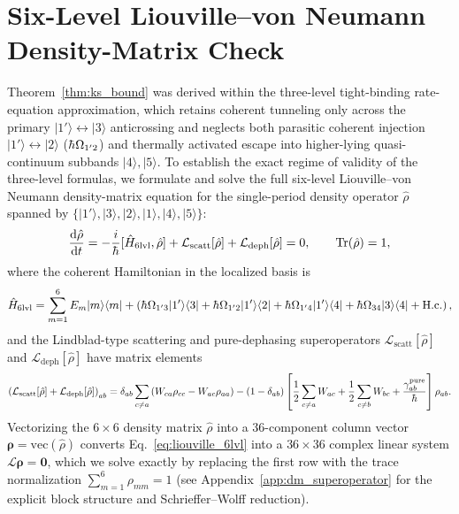 \documentclass[11pt,letterpaper]{article}
\renewcommand{\hbar}{\mathchar'26\mkern-9mu h}
\begin{document}
\section{Six-Level Liouville--von Neumann Density-Matrix Check}
\label{sec:dm_check}

Theorem~\ref{thm:ks_bound} was derived within the three-level tight-binding rate-equation approximation, which retains coherent tunneling only across the primary $|1'\rangle \leftrightarrow |3\rangle$ anticrossing and neglects both parasitic coherent injection $|1'\rangle \leftrightarrow |2\rangle$ ($\hbar\Omega_{1'2}$) and thermally activated escape into higher-lying quasi-continuum subbands $|4\rangle, |5\rangle$. To establish the exact regime of validity of the three-level formulas, we formulate and solve the full six-level Liouville--von Neumann density-matrix equation for the single-period density operator $\hat{\rho}$ spanned by $\{|1'\rangle, |3\rangle, |2\rangle, |1\rangle, |4\rangle, |5\rangle\}$:
\begin{equation}
\frac{\mathrm{d}\hat{\rho}}{\mathrm{d}t} = -\frac{i}{\hbar}[\hat{H}_{\mathrm{6lvl}}, \hat{\rho}] + \mathcal{L}_{\mathrm{scatt}}[\hat{\rho}] + \mathcal{L}_{\mathrm{deph}}[\hat{\rho}] = 0, \qquad \mathrm{Tr}(\hat{\rho}) = 1,
\label{eq:liouville_6lvl}
\end{equation}
where the coherent Hamiltonian in the localized basis is
\begin{equation}
\hat{H}_{\mathrm{6lvl}} = \sum_{m=1}^{6} E_m |m\rangle\langle m| + \left( \hbar\Omega_{1'3}|1'\rangle\langle 3| + \hbar\Omega_{1'2}|1'\rangle\langle 2| + \hbar\Omega_{1'4}|1'\rangle\langle 4| + \hbar\Omega_{34}|3\rangle\langle 4| + \mathrm{H.c.} \right),
\label{eq:h_6lvl}
\end{equation}
and the Lindblad-type scattering and pure-dephasing superoperators $\mathcal{L}_{\mathrm{scatt}}[\hat{\rho}]$ and $\mathcal{L}_{\mathrm{deph}}[\hat{\rho}]$ have matrix elements
\begin{equation}
\left(\mathcal{L}_{\mathrm{scatt}}[\hat{\rho}] + \mathcal{L}_{\mathrm{deph}}[\hat{\rho}]\right)_{ab} = \delta_{ab}\sum_{c \neq a}\left(W_{ca}\rho_{cc} - W_{ac}\rho_{aa}\right) - (1 - \delta_{ab})\left[\frac{1}{2}\sum_{c\neq a}W_{ac} + \frac{1}{2}\sum_{c\neq b}W_{bc} + \frac{\gamma_{ab}^{\mathrm{pure}}}{\hbar}\right]\rho_{ab}.
\label{eq:superoperator_elements}
\end{equation}
Vectorizing the $6\times 6$ density matrix $\hat{\rho}$ into a $36$-component column vector $\bm{\rho} = \mathrm{vec}(\hat{\rho})$ converts Eq.~\eqref{eq:liouville_6lvl} into a $36\times 36$ complex linear system $\mathcal{L}\bm{\rho} = \bm{0}$, which we solve exactly by replacing the first row with the trace normalization $\sum_{m=1}^6 \rho_{mm} = 1$ (see Appendix~\ref{app:dm_superoperator} for the explicit block structure and Schrieffer--Wolff reduction).
\end{document}
